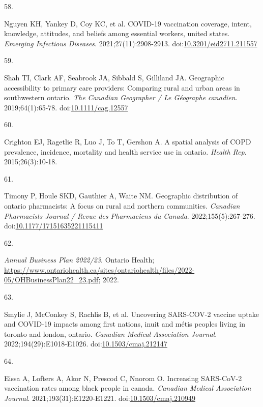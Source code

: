 \documentclass[
  letterpaper,
  DIV=11,
  numbers=noendperiod]{scrartcl}
\newlength{\cslhangindent}
\newlength{\csllabelwidth}
\newlength{\cslentryspacingunit} %
\newenvironment{CSLReferences}[2] %
 {%
  \setlength{\parindent}{0pt}
  \ifodd #1
  \let\oldpar\par
  \def\par{\hangindent=\cslhangindent\oldpar}
  \fi
  \setlength{\parskip}{#2\cslentryspacingunit}
 }%
 {}
\newcommand{\CSLLeftMargin}[1]{\parbox[t]{\csllabelwidth}{#1}}
\newcommand{\CSLRightInline}[1]{\parbox[t]{\linewidth - \csllabelwidth}{#1}\break}
\begin{document}
\begin{CSLReferences}{0}{0}
\leavevmode{}%
\CSLLeftMargin{58. }%
\CSLRightInline{Nguyen KH, Yankey D, Coy KC, et al. {COVID}-19
vaccination coverage, intent, knowledge, attitudes, and beliefs among
essential workers, united states. \emph{Emerging Infectious Diseases}.
2021;27(11):2908-2913.
doi:\href{https://doi.org/10.3201/eid2711.211557}{10.3201/eid2711.211557}}

\leavevmode{}%
\CSLLeftMargin{59. }%
\CSLRightInline{Shah TI, Clark AF, Seabrook JA, Sibbald S, Gilliland JA.
Geographic accessibility to primary care providers: Comparing rural and
urban areas in southwestern ontario. \emph{The Canadian Geographer / Le
G{é}ographe canadien}. 2019;64(1):65-78.
doi:\href{https://doi.org/10.1111/cag.12557}{10.1111/cag.12557}}

\leavevmode{}%
\CSLLeftMargin{60. }%
\CSLRightInline{Crighton EJ, Ragetlie R, Luo J, To T, Gershon A. A
spatial analysis of {COPD} prevalence, incidence, mortality and health
service use in ontario. \emph{Health Rep}. 2015;26(3):10-18.}

\leavevmode{}%
\CSLLeftMargin{61. }%
\CSLRightInline{Timony P, Houle SKD, Gauthier A, Waite NM. Geographic
distribution of ontario pharmacists: A focus on rural and northern
communities. \emph{Canadian Pharmacists Journal / Revue des Pharmaciens
du Canada}. 2022;155(5):267-276.
doi:\href{https://doi.org/10.1177/17151635221115411}{10.1177/17151635221115411}}

\leavevmode{}%
\CSLLeftMargin{62. }%
\CSLRightInline{\emph{{A}nnual {B}usiness {P}lan 2022/23}. Ontario
Health;
\url{https://www.ontariohealth.ca/sites/ontariohealth/files/2022-05/OHBusinessPlan22_23.pdf};
2022.}

\leavevmode{}%
\CSLLeftMargin{63. }%
\CSLRightInline{Smylie J, McConkey S, Rachlis B, et al. Uncovering
{SARS}-{COV}-2 vaccine uptake and {COVID}-19 impacts among first
nations, inuit and m{é}tis peoples living in toronto and london,
ontario. \emph{Canadian Medical Association Journal}.
2022;194(29):E1018-E1026.
doi:\href{https://doi.org/10.1503/cmaj.212147}{10.1503/cmaj.212147}}

\leavevmode{}%
\CSLLeftMargin{64. }%
\CSLRightInline{Eissa A, Lofters A, Akor N, Prescod C, Nnorom O.
Increasing {SARS}-{CoV}-2 vaccination rates among black people in
canada. \emph{Canadian Medical Association Journal}.
2021;193(31):E1220-E1221.
doi:\href{https://doi.org/10.1503/cmaj.210949}{10.1503/cmaj.210949}}


\end{CSLReferences}
\end{document}
